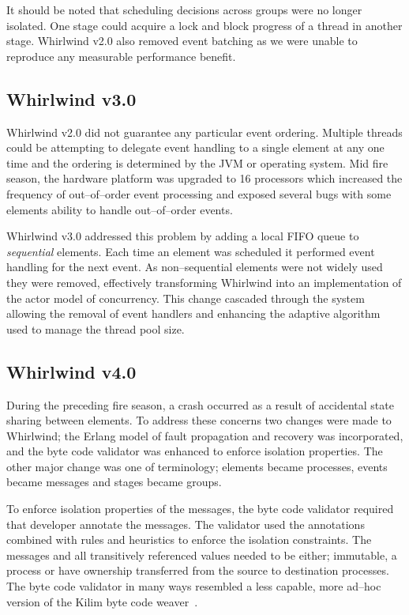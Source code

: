 \documentclass[conference]{IEEEtran}
\begin{document}
It should be noted that scheduling decisions across groups were no longer isolated. One stage could acquire a lock and block progress of a thread in another stage. Whirlwind v2.0 also removed event batching as we were unable to reproduce any measurable performance benefit.

\subsection{Whirlwind v3.0}

Whirlwind v2.0 did not guarantee any particular event ordering. Multiple threads could be attempting to delegate event handling to a single element at any one time and the ordering is determined by the JVM or operating system. Mid fire season, the hardware platform was upgraded to 16 processors which increased the frequency of out--of--order event processing and exposed several bugs with some elements ability to handle out--of--order events. 

Whirlwind v3.0 addressed this problem by adding a local FIFO queue to \emph{sequential} elements. Each time an element was scheduled it performed event handling for the next event. As non--sequential elements were not widely used they were removed, effectively transforming Whirlwind into an implementation of the actor model of concurrency. This change cascaded through the system allowing the removal of event handlers and enhancing the adaptive algorithm used to manage the thread pool size. 

\subsection{Whirlwind v4.0}

During the preceding fire season, a crash occurred as a result of accidental state sharing between elements. To address these concerns two changes were made to Whirlwind; the Erlang model of fault propagation and recovery was incorporated, and the byte code validator was enhanced to enforce isolation properties. The other major change was one of terminology; elements became processes, events became messages and stages became groups.

To enforce isolation properties of the messages, the byte code validator required that developer annotate the messages. The validator used the annotations combined with rules and heuristics to enforce the isolation constraints. The messages and all transitively referenced values needed to be either; immutable, a process or have ownership transferred from the source to destination processes. The byte code validator in many ways resembled a less capable, more ad--hoc version of the Kilim byte code weaver~\cite{Srinivasan:08:Kilim}.
\end{document}
